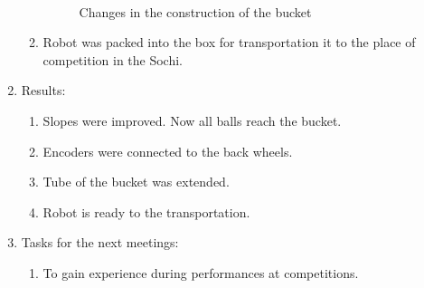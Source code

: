 \begin{enumerate}
\begin{enumerate}
      \begin{figure}[H]
      	\begin{minipage}[h]{0.2\linewidth}
      		\center  
      	\end{minipage}
      	\begin{minipage}[h]{0.6\linewidth}
      		\caption{Changes in the construction of the bucket}
      	\end{minipage}
      \end{figure}
      
      \item Robot was packed into the box for transportation it to the place of competition in the Sochi.
          
    \end{enumerate}
    
	\item Results: 
	\begin{enumerate}
	  \item Slopes were improved. Now all balls reach the bucket.
	  
      \item Encoders were connected to the back wheels.
      
      \item Tube of the bucket was extended.
      
      \item Robot is ready to the transportation.
      
    \end{enumerate}
    
	\item Tasks for the next meetings:
	\begin{enumerate}
	  \item To gain experience during performances at competitions.
	  
    \end{enumerate}     
\end{enumerate}
\fillpage